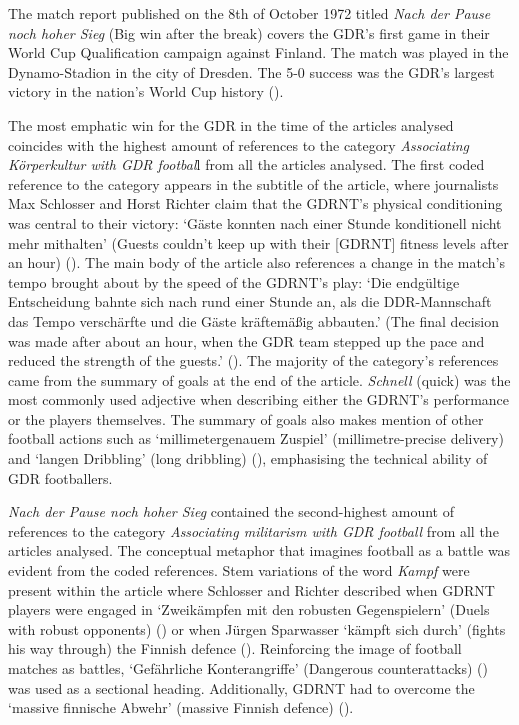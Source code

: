 The match report published on the 8th of October 1972 titled \textit{Nach der Pause noch hoher Sieg} (Big win after the break) covers the GDR’s first game in their World Cup Qualification campaign against Finland. The match was played in the Dynamo-Stadion in the city of Dresden. The 5-0 success was the GDR’s largest victory in the nation’s World Cup history (\cite{dähn2013}).

The most emphatic win for the GDR in the time of the articles analysed coincides with the highest amount of references to the category \textit{Associating Körperkultur with GDR footbal}l from all the articles analysed. The first coded reference to the category appears in the subtitle of the article, where journalists Max Schlosser and Horst Richter claim that the GDRNT’s physical conditioning was central to their victory: ‘Gäste konnten nach einer Stunde konditionell nicht mehr mithalten’ (Guests couldn't keep up with their [GDRNT] fitness levels after an hour) (\cite{nd19721008}). The main body of the article also references a change in the match’s tempo brought about by the speed of the GDRNT’s play: ‘Die endgültige Entscheidung bahnte sich nach rund einer Stunde an, als die DDR-Mannschaft das Tempo verschärfte und die Gäste kräftemäßig abbauten.’ (The final decision was made after about an hour, when the GDR team stepped up the pace and reduced the strength of the guests.’ (\cite{nd19721008}). The majority of the category’s references came from the summary of goals at the end of the article. \textit{Schnell} (quick) was the most commonly used adjective when describing either the GDRNT’s performance or the players themselves. The summary of goals also makes mention of other football actions such as ‘millimetergenauem Zuspiel’ (millimetre-precise delivery) and ‘langen Dribbling’ (long dribbling) (\cite{nd19721008}), emphasising the technical ability of GDR footballers.

\textit{Nach der Pause noch hoher Sieg} contained the second-highest amount of references to the category \textit{Associating militarism with GDR football} from all the articles analysed. The conceptual metaphor that imagines football as a battle was evident from the coded references. Stem variations of the word \textit{Kampf} were present within the article where Schlosser and Richter described when GDRNT players were engaged in ‘Zweikämpfen mit den robusten Gegenspielern’ (Duels with robust opponents) (\cite{nd19721008}) or when Jürgen Sparwasser ‘kämpft sich durch’ (fights his way through) the Finnish defence (\cite{nd19721008}). Reinforcing the image of football matches as battles, ‘Gefährliche Konterangriffe’ (Dangerous counterattacks) (\cite{nd19721008}) was used as a sectional heading. Additionally, GDRNT had to overcome the ‘massive finnische Abwehr’ (massive Finnish defence) (\cite{nd19721008}).

